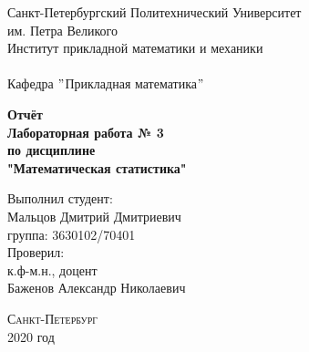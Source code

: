 \documentclass[a4]{article}
\begin{document}
	\def\contentsname{\LARGE{Содержание}}
	\thispagestyle{empty}
	\begin{center} 
		\vspace{2cm} 
		{\Large \sc Санкт-Петербургский Политехнический Университет}\\
		\vspace{2mm}
		{\Large\sc им. Петра Великого}\\
		\vspace{1cm}
		{\large \sc Институт прикладной математики и механики\\ 
			\vspace{0.5mm}
			\textsc{}}\\ 
		\vspace{0.5mm}
		{\large\sc Кафедра $"$Прикладная математика$"$}\\
		\vspace{15mm}
		
		
		{\sc \textbf{Отчёт\\
			Лабораторная работа № 3\\
			по дисциплине\\
			"Математическая статистика"}
			\vspace{6mm}
			
		}
		\vspace*{2mm}
		
		
		\begin{flushleft}
			\vspace{4cm}
			\sc Выполнил студент:\\
			\sc Мальцов Дмитрий Дмитриевич\\
			\sc группа: 3630102/70401\\
			\vspace{1cm}
			\sc Проверил:\\
			\sc к.ф-м.н., доцент\\
			\sc Баженов Александр Николаевич
			\vspace{20mm}
		\end{flushleft}
	\end{center} 
	\begin{center}
		\vfill {\large\textsc{Санкт-Петербург}}\\ 
		2020 год
	\end{center}
	
	\newpage
	\pagestyle{plain}
	
	
	
\end{document}
